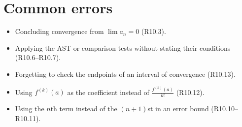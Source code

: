 \documentclass{apcalc}
\begin{document}
\section{Common errors}
\begin{itemize}
\item Concluding convergence from $\lim a_n=0$ (R10.3).
\item Applying the AST or comparison tests without stating their conditions (R10.6--R10.7).
\item Forgetting to check the endpoints of an interval of convergence (R10.13).
\item Using $f^{(k)}(a)$ as the coefficient instead of $\frac{f^{(k)}(a)}{k!}$ (R10.12).
\item Using the $n$th term instead of the $(n+1)$st in an error bound (R10.10--R10.11).
\end{itemize}
\end{document}
